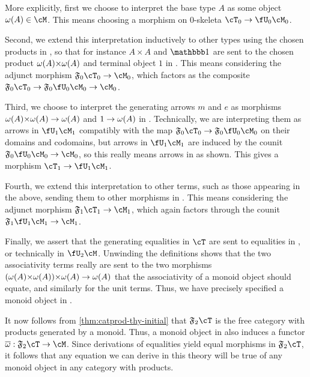 More explicitly, first we choose to interpret the base type $A$ as some object $\pfree(A)\in \cM$.
This means choosing a morphism on 0-skeleta $\cT_0 \to \fU_0\cM_0$.

Second, we extend this interpretation inductively to other types using the chosen products in \cM, so that for instance $A\times A$ and $\unit$ are sent to the chosen product $\pfree(A) \times \pfree(A)$ and terminal object $1$ in \cM.
This means considering the adjunct morphism $\F0\cT_0 \to \cM_0$, which factors as the composite $\F0\cT_0 \to \F0 \fU_0 \cM_0 \to \cM_0$.

Third, we choose to interpret the generating arrows $m$ and $e$ as morphisms $\pfree(A) \times \pfree(A) \to \pfree(A)$ and $1\to \omega(A)$ in \cM.
Technically, we are interpreting them as arrows in $\fU_1 \cM_1$ compatibly with the map $\F0\cT_0 \to \F0 \fU_0 \cM_0$ on their domains and codomains, but arrows in $\fU_1 \cM_1$ are induced by the counit $\F0 \fU_0 \cM_0 \to \cM_0$, so this really means arrows in \cM as shown.
This gives a morphism $\cT_1 \to \fU_1\cM_1$.

Fourth, we extend this interpretation to other terms, such as those appearing in the above, sending them to other morphisms in \cM.
This means considering the adjunct morphism $\F1 \cT_1 \to \cM_1$, which again factors through the counit $\F1 \fU_1 \cM_1 \to \cM_1$.

Finally, we assert that the generating equalities in $\cT$ are sent to equalities in \cM, or technically in $\fU_2 \cM$.
Unwinding the definitions shows that the two associativity terms really are sent to the two morphisms $(\pfree(A)\times \pfree(A))\times \pfree(A) \to \pfree(A)$ that the associativity of a monoid object should equate, and similarly for the unit terms.
Thus, we have precisely specified a monoid object in \cM.

It now follows from \cref{thm:catprod-thy-initial} that $\F{2}\cT$ is the free category with products generated by a monoid.
Thus, a monoid object in \cM also induces a functor $\free:\F{2}\cT\to\cM$.
Since derivations of equalities yield equal morphisms in $\F2\cT$, it follows that any equation we can derive in this theory will be true of any monoid object in any category with products.

